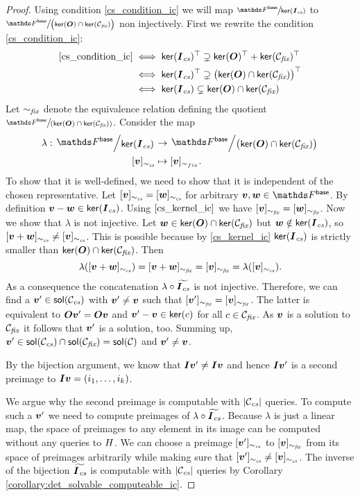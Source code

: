 \begin{proof}
    Using condition \eqref{cs_condition_ic} we will map
    $\sfrac{\Fsp}{\ker(\Ics)}$ to $\sfrac{\Fsp}{\big(\ker(\O) \cap \ker(\Cfix)\big)}$
    non injectively.
    First we rewrite the condition \eqref{cs_condition_ic}:
    \begin{align}
    \eqref{cs_condition_ic} &\iff \mathsf{ker}(\boldsymbol{I}_\textit{cs})^\top \supsetneq \mathsf{ker}(\boldsymbol{O})^\top + \mathsf{ker}(\mathcal{C}_\textit{fix})^\top \\
    &\iff \mathsf{ker}(\boldsymbol{I}_\textit{cs})^\top \supsetneq \big(\mathsf{ker}(\boldsymbol{O}) \cap \mathsf{ker}(\mathcal{C}_\textit{fix})\big)^\top \\
    \label{cs_kernel_ic}
    &\iff \mathsf{ker}(\boldsymbol{I}_\textit{cs}) \subsetneq \mathsf{ker}(\boldsymbol{O}) \cap \mathsf{ker}(\mathcal{C}_\textit{fix})
    \end{align}
    Let ${\sim_\textit{fix}}$ denote the equivalence relation defining the quotient $\sfrac{\Fsp}{(\ker(\O) \cap \ker(\Cfix))}$.
    Consider the map
    \begin{align*}
        \lambda: \bigslant{\Fsp}{\ker(\Ics)} &\to \bigslant{\Fsp}{\big(\ker(\O) \cap \ker(\Cfix)\big)} \\
        [\vv]_{\simcs} &\mapsto [\vv]_{\sim_{fix}}.
    \end{align*}
    To show that it is well-defined,
    we need to show that it is independent of the chosen representative.
    Let $[\boldsymbol v]_{\sim_\textit{cs}} = [\boldsymbol w]_{\sim_\textit{cs}}$ for arbitrary $\vv,\vw \in \Fsp$.
    By definition $\boldsymbol v-\boldsymbol w \in \mathsf{ker}(\boldsymbol{I}_\textit{cs})$.
    Using $\eqref{cs_kernel_ic}$ we have $[\boldsymbol v]_{\sim_\textit{fix}} = [\boldsymbol w]_{\sim_\textit{fix}}$.
    Now we show that $\lambda$ is not injective.
    Let $\boldsymbol w \in \mathsf{ker}(\boldsymbol{O}) \cap \mathsf{ker}(\mathcal{C}_\textit{fix})$ but $\boldsymbol w \notin \mathsf{ker}(\boldsymbol{I}_\textit{cs})$,
    so $[\boldsymbol v + \boldsymbol w]_{\sim_\textit{cs}} \neq [\boldsymbol v]_{\sim_\textit{cs}}$.
    This is possible because by \eqref{cs_kernel_ic} $\mathsf{ker}(\boldsymbol{I}_\textit{cs})$ is strictly smaller than $\mathsf{ker}(\boldsymbol{O}) \cap \mathsf{ker}(\mathcal{C}_\textit{fix})$.
    Then
    \[
        \lambda([\boldsymbol v + \boldsymbol w]_{\sim_\textit{cs}}) = [\boldsymbol v + \boldsymbol w]_{\sim_\textit{fix}} = [\boldsymbol v]_{\sim_\textit{fix}} = \lambda([\boldsymbol v]_{\sim_\textit{cs}}).
    \]
    As a consequence the concatenation $\lambda \circ \widetilde{\boldsymbol{I}_\textit{cs}}$ is not injective.
    Therefore, we can find a $\boldsymbol v' \in \mathsf{sol}(\mathcal{C}_\textit{cs})$ with $\boldsymbol v' \neq \boldsymbol v$ such that $[\boldsymbol v']_{\sim_\textit{fix}} = [\boldsymbol v]_{\sim_\textit{fix}}$.
    The latter is equivalent to $\boldsymbol{O}\boldsymbol v' = \boldsymbol{O}\boldsymbol v$ and $\boldsymbol v' - \boldsymbol v \in \mathsf{ker}(c)$ for all $c \in \mathcal{C}_\textit{fix}$.
    As $\boldsymbol v$ is a solution to $\mathcal{C}_\textit{fix}$ it follows that $\boldsymbol v'$ is a solution, too.
    Summing up, $\boldsymbol v' \in \mathsf{sol}(\mathcal{C}_\textit{cs}) \cap \mathsf{sol}(\mathcal{C}_\textit{fix}) = \mathsf{sol}(\mathcal{C})$ and $\boldsymbol v' \neq \boldsymbol v$.
    
    By the bijection argument, we know that $\boldsymbol{I}\boldsymbol v' \neq \boldsymbol{I}\boldsymbol v$ and hence
    $\boldsymbol{I}\boldsymbol v'$ is a second preimage to $\boldsymbol{I}\boldsymbol v = (i_1, \dots, i_{k})$.
    
    We argue why the second preimage is computable with $|\mathcal{C}_\textit{cs}|$ queries.
    To compute such a $\boldsymbol v'$ we need to compute preimages of $\lambda \circ \widetilde{\boldsymbol{I}_\textit{cs}}$.
    Because $\lambda$ is just a linear map, the space of preimages to any element in its image can be computed without any queries to $H$.
    We can choose a preimage $[\boldsymbol v']_{\sim_\textit{cs}}$ to $[\boldsymbol v]_{\sim_\textit{fix}}$ from its space of preimages arbitrarily while making sure that $[\boldsymbol v']_{\sim_\textit{cs}} \neq [\boldsymbol v]_{\sim_\textit{cs}}$.
    The inverse of the bijection $\widetilde{\boldsymbol{I}_\textit{cs}}$ is computable with $|\mathcal{C}_\textit{cs}|$ queries by Corollary \ref{corollary:det_solvable_computeable_ic}.
\end{proof}

